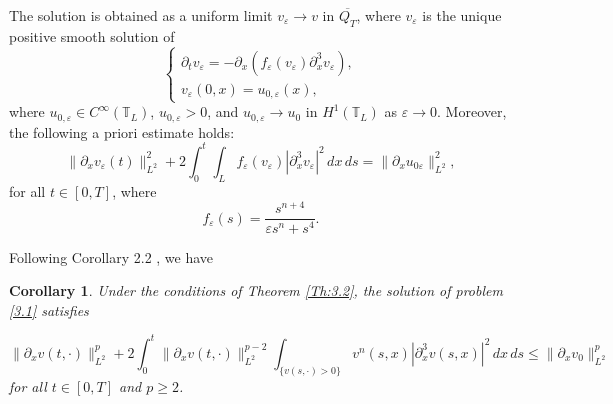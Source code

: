\documentclass[a4paper,12pt]{article}
\newtheorem{corollary}[definition]{Corollary}
\numberwithin{equation}{section}
\newcommand{\ve}{{\varepsilon}}
\def\ve{\varepsilon}
\def\d{\partial}
\begin{document}
The solution is obtained as a uniform limit $v_\varepsilon \to v$  in $\overline{Q_T}$, where $v_\ve$  is the unique positive smooth solution of
\begin{equation*}
\begin{cases}
\partial_t v_\varepsilon
= -\partial_x\!\left(
f_\varepsilon(v_\varepsilon) \partial_x^3 v_\varepsilon
\right), \\[0.3em]
v_\varepsilon(0,x) = u_{0,\varepsilon}(x),
\end{cases}
\label{3.2}
\end{equation*}
where $u_{0,\varepsilon}\in C^\infty(\mathbb{T}_L)$,
$u_{0,\varepsilon}>0$, and
$u_{0,\varepsilon}\to u_0$ in $H^1(\mathbb{T}_L)$ as $\varepsilon\to 0$. Moreover, the following a priori estimate holds:
\begin{equation*}
\|\partial_x v_\varepsilon(t)\|_{L^2}^2
+ 2\int_0^t \!\!\int_{L}
f_\varepsilon(v_\varepsilon)
|\partial_x^3 v_\varepsilon|^2
\,dx\,ds
=
\|\partial_x u_{0\varepsilon}\|_{L^2}^2,
\end{equation*}
for all $t\in[0,T]$, where
\begin{equation*}
f_\varepsilon(s)
=
\frac{s^{n+4}}{\varepsilon s^{n} + s^4}.
\label{eq:feps}
\end{equation*}













Following Corollary 2.2 \cite{Gess1}, we have

\begin{corollary}
\label{cor:estimate}
Under the conditions of Theorem \ref{Th:3.2}, the solution of problem \eqref{3.1} satisfies

\begin{equation}
\label{3.4*}
\|\d_x v(t, \cdot)\|_{L^2}^p
+ 2 \int_0^t \|\d_x v(t, \cdot)\|_{L^2}^{p-2}
\int_{\{v(s, \cdot)>0\}} v^n(s,x) |\d_x^3 v(s,x)|^2\, dx \, ds
\le
\|\d_x v_0\|_{L^2}^p
\end{equation}
for all $t \in [0,T]$ and $p \ge 2$.
\end{corollary}
\end{document}
